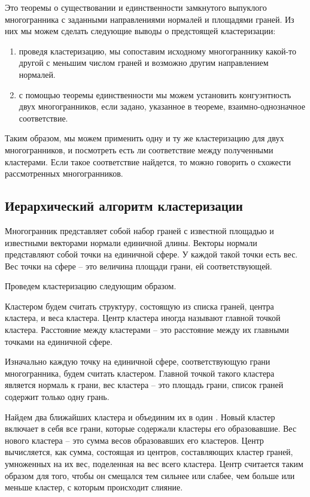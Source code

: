 \documentclass[a4paper,12pt, titlepage]{article}
\begin{document}
Это теоремы о существовании и единственности замкнутого выпуклого многогранника с заданными направлениями нормалей
и площадями граней. Из них мы можем сделать следующие выводы о предстоящей кластеризации:
\begin{enumerate} 
\item проведя кластеризацию, мы сопоставим исходному многограннику
какой-то другой с меньшим числом граней и возможно другим направлением нормалей. 
\item с помощью теоремы единственности мы можем установить конгуэнтность двух многогранников, если задано, указанное в теореме,
взаимно-однозначное соответствие.
\end{enumerate}

Таким образом, мы можем применить одну и ту же кластеризацию для двух многогранников, и посмотреть есть ли соответствие между
полученными кластерами. Если такое соответствие найдется, то можно говорить о схожести рассмотренных многогранников. 

\subsection{Иерархический алгоритм кластеризации}
Многогранник представляет собой набор граней с известной площадью и известными векторами нормали единичной длины. Векторы 
нормали представляют собой точки на единичной сфере. У каждой такой точки есть вес. Вес точки на сфере -- это величина площади 
грани, ей соответствующей. 

Проведем кластеризацию следующим образом. 

Кластером будем считать структуру, состоящую из списка граней, 
центра кластера, и веса кластера. Центр кластера иногда называют главной точкой кластера. 
Расстояние между кластерами -- это расстояние между их главными точками на единичной сфере.  

Изначально каждую точку на единичной сфере, соответствующую грани многогранника, будем считать кластером. Главной точкой такого
кластера является нормаль к грани, вес кластера -- это площадь грани, список граней содержит только одну грань.   

Найдем два ближайших кластера и объединим их в один \cite{hier}. Новый кластер включает в себя все грани, которые содержали 
кластеры его образовавшие. Вес нового кластера -- это сумма весов образовавших его кластеров. Центр вычисляется, как
сумма, состоящая из центров, составляющих кластер граней, умноженных на их вес, поделенная на вес всего кластера.
Центр считается таким образом для того, чтобы он смещался тем сильнее или слабее, чем больше или меньше кластер,
с которым происходит слияние. 
\end{document}
